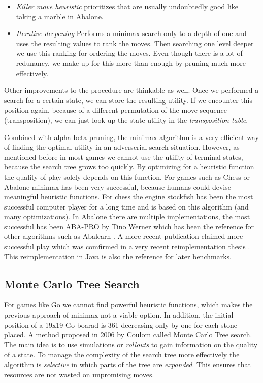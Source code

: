 \begin{itemize}
    \item \textit{Killer move heuristic} prioritizes that are usually undoubtedly good like taking a marble in Abalone.
    \item \textit{Iterative deepening} Performs a minimax search only to a depth of one and uses the resulting values to rank the moves. Then searching one level deeper we use this ranking for ordering the moves. Even though there is a lot of redunancy, we make up for this more than enough by pruning much more effectively.
\end{itemize}

Other improvements to the procedure are thinkable as well. Once we performed a search for a certain state, we can store the resulting utility. If we encounter this position again, because of a different permutation of the move sequence (transposition), we can just look up the state utility in the \textit{transposition table}.

Combined with alpha beta pruning, the minimax algorithm is a very efficient way of finding the optimal utility in an adverserial search situation. However, as mentioned before in most games we cannot use the utility of terminal states, because the search tree grows too quickly. By optimizing for a heuristic function the quality of play solely depends on this function. For games such as Chess or Abalone minimax has been very successful, because humans could devise meaningful heuristic functions. For chess the engine stockfish has been the most successful computer player for a long time and is based on this algorithm (and many optimizations). \cite{noauthor_stockfish_2021, noauthor_stockfish_nodate} In Abalone there are multiple implementations, the most successful has been ABA-PRO by Tino Werner \cite{aichholzer_algorithmic_2002} which has been the reference for other algorithms such as Abalearn \cite{campos_abalearn_2003}. A more recent publication claimed more successful play \cite{papadopoulos_exploring_2012} which was comfirmed in a very recent reimplementation thesis \cite{verloop_critical_nodate}. This reimplementation in Java \cite{verloop_abaloneai_nodate} is also the reference for later benchmarks.

\subsection{Monte Carlo Tree Search}
For games like Go we cannot find powerful heuristic functions, which makes the previous approach of minimax not a viable option. In addition, the initial position of a 19x19 Go boarad is 361 decreasing only by one for each stone placed. A method proposed in 2006 by Coulom \cite{coulom_efficient_2007} called Monte Carlo Tree search. The main idea is to use simulations or \textit{rollouts} to gain information on the quality of a state. To manage the complexity of the search tree more effectively the algorithm is \textit{selective} in which parts of the tree are \textit{expanded}. This ensures that resources are not wasted on unpromising moves.

